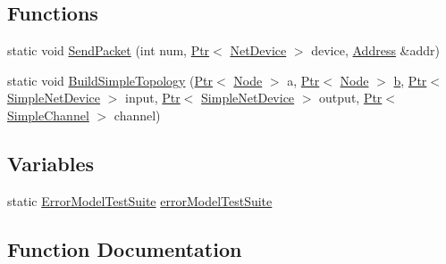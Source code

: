 \subsection*{Functions}
\begin{DoxyCompactItemize}
\item 
static void \hyperlink{error-model-test-suite_8cc_a9bb9e47042238c65657a8e00cd67f111}{Send\+Packet} (int num, \hyperlink{classns3_1_1Ptr}{Ptr}$<$ \hyperlink{classns3_1_1NetDevice}{Net\+Device} $>$ device, \hyperlink{classns3_1_1Address}{Address} \&addr)
\item 
static void \hyperlink{error-model-test-suite_8cc_af6fe24088bb4cfa248fc1b0bad6e1dfc}{Build\+Simple\+Topology} (\hyperlink{classns3_1_1Ptr}{Ptr}$<$ \hyperlink{classns3_1_1Node}{Node} $>$ a, \hyperlink{classns3_1_1Ptr}{Ptr}$<$ \hyperlink{classns3_1_1Node}{Node} $>$ \hyperlink{lte__pathloss_8m_a21ad0bd836b90d08f4cf640b4c298e7c}{b}, \hyperlink{classns3_1_1Ptr}{Ptr}$<$ \hyperlink{classns3_1_1SimpleNetDevice}{Simple\+Net\+Device} $>$ input, \hyperlink{classns3_1_1Ptr}{Ptr}$<$ \hyperlink{classns3_1_1SimpleNetDevice}{Simple\+Net\+Device} $>$ output, \hyperlink{classns3_1_1Ptr}{Ptr}$<$ \hyperlink{classns3_1_1SimpleChannel}{Simple\+Channel} $>$ channel)
\end{DoxyCompactItemize}
\subsection*{Variables}
\begin{DoxyCompactItemize}
\item 
static \hyperlink{classErrorModelTestSuite}{Error\+Model\+Test\+Suite} \hyperlink{error-model-test-suite_8cc_a35766d56f567ab35a8933ebacb38b8b7}{error\+Model\+Test\+Suite}
\end{DoxyCompactItemize}


\subsection{Function Documentation}
